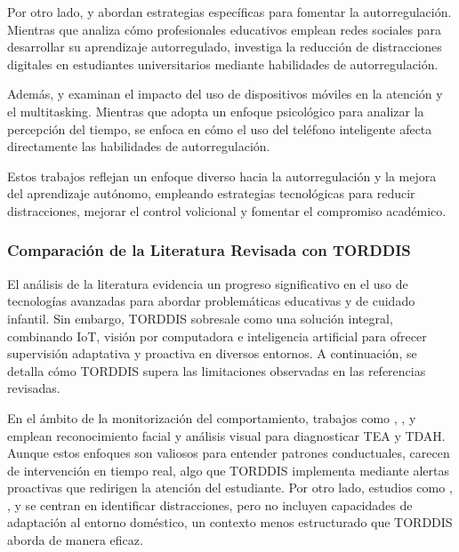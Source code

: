 \documentclass[a4paper,fleqn]{cas-sc}
\begin{document}
			Por otro lado, \cite{Muljana2022Instructional} y \cite{Wang2022Empowering} abordan estrategias específicas para fomentar la autorregulación. Mientras que \cite{Muljana2022Instructional} analiza cómo profesionales educativos emplean redes sociales para desarrollar su aprendizaje autorregulado, \cite{Wang2022Empowering} investiga la reducción de distracciones digitales en estudiantes universitarios mediante habilidades de autorregulación.
			
			Además, \cite{Hartley2022Smartphone} y \cite{Labar2019Interplay} examinan el impacto del uso de dispositivos móviles en la atención y el multitasking. Mientras que \cite{Labar2019Interplay} adopta un enfoque psicológico para analizar la percepción del tiempo, \cite{Hartley2022Smartphone} se enfoca en cómo el uso del teléfono inteligente afecta directamente las habilidades de autorregulación.
			
			Estos trabajos reflejan un enfoque diverso hacia la autorregulación y la mejora del aprendizaje autónomo, empleando estrategias tecnológicas para reducir distracciones, mejorar el control volicional y fomentar el compromiso académico.
			
		\subsubsection{Comparación de la Literatura Revisada con TORDDIS}
			El análisis de la literatura evidencia un progreso significativo en el uso de tecnologías avanzadas para abordar problemáticas educativas y de cuidado infantil. Sin embargo, TORDDIS sobresale como una solución integral, combinando IoT, visión por computadora e inteligencia artificial para ofrecer supervisión adaptativa y proactiva en diversos entornos. A continuación, se detalla cómo TORDDIS supera las limitaciones observadas en las referencias revisadas.
			
			En el ámbito de la monitorización del comportamiento, trabajos como \cite{Akter2021}, \cite{Pelc2006}, y \cite{Albrecht2014} emplean reconocimiento facial y análisis visual para diagnosticar TEA y TDAH. Aunque estos enfoques son valiosos para entender patrones conductuales, carecen de intervención en tiempo real, algo que TORDDIS implementa mediante alertas proactivas que redirigen la atención del estudiante. Por otro lado, estudios como \cite{Campbell2015Using}, \cite{Ucar2022Recognizing}, y \cite{Argel2023Intellitell} se centran en identificar distracciones, pero no incluyen capacidades de adaptación al entorno doméstico, un contexto menos estructurado que TORDDIS aborda de manera eficaz.
			
\end{document}
